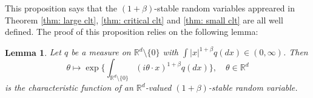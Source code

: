 \documentclass[12pt,a4paper]{amsart}
\theoremstyle{plain}
\newtheorem{lem}[thm]{Lemma}
\theoremstyle{definition}
\numberwithin{equation}{section}
\begin{document}
    This proposition says that the $(1+\beta)$-stable random variables appreared in Theorem \ref{thm: large clt}, \ref{thm: critical clt} and \ref{thm: small clt} are all well defined. 
    The proof of this proposition relies on the following lemma:
\begin{lem}
\label{lem: charactreisticfunction}
    Let $q$ be a measure on $\mathbb R^d\setminus\{0\}$ with $\int |x|^{1+\beta} q(dx) \in (0,\infty)$.
    Then 
\[
    \theta \mapsto  \exp\Big\{\int_{\mathbb R^d\setminus\{0\}} (i\theta \cdot x)^{1+\beta} q(dx)\Big\},
    \quad \theta \in \mathbb R^d
\]
    is the characteristic function of an $\mathbb R^d$-valued $(1+\beta)$-stable random variable.
\end{lem}
\end{document}
